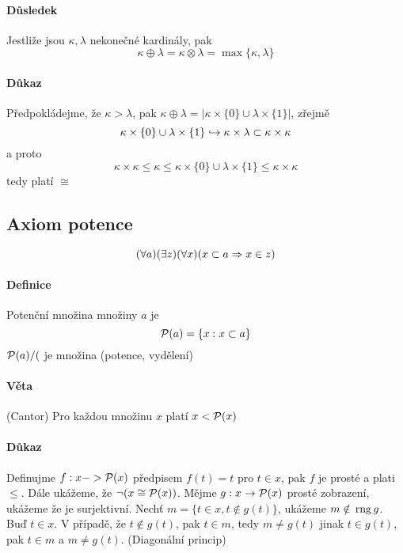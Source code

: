 \documentclass[a4paper,12pt,titlepage]{article}
\begin{document}
\paragraph{Důsledek} 
Jestliže jsou $\kappa, \lambda$ nekonečné kardinály, pak 
$$
	\kappa \oplus \lambda = \kappa \otimes \lambda =  \max\{\kappa, \lambda\}
$$

\paragraph{Důkaz}
Předpokládejme, že $\kappa > \lambda$, pak $\kappa \oplus \lambda = |\kappa \times \{0\} 
\cup \lambda \times \{1\}|$, zřejmě 
$$
\kappa \times \{0\} \cup \lambda \times \{1\} 
	\hookrightarrow \kappa \times \lambda \subset \kappa \times \kappa \\
$$
a proto
$$
	\kappa \times \kappa \le \kappa \le \kappa \times \{0\} \cup \lambda \times \{1\}
		\le \kappa \times \kappa
$$
tedy platí $\cong$


\subsection{Axiom potence}
$$
	(\forall a)(\exists z)(\forall x)(x \subset a \Rightarrow x \in z)
$$

\paragraph{Definice}
Potenční množina množiny $a$ je 
$$
	\mathcal{P}(a) = \{ x: x \subset a \}
$$
$\mathcal{P}(a)/($ je množina (potence, vydělení)

\paragraph{Věta}
(Cantor) Pro každou množinu $x$ platí $x < \mathcal{P}(x)$

\paragraph{Důkaz}
Definujme $f: x -> \mathcal{P}(x)$ předpisem $f(t) = {t}$ pro $t \in x$, pak $f$ je prosté
a plati $\le$. Dále ukážeme, že $ \neg (x \cong \mathcal{P}(x))$. Mějme $g: x \to \mathcal{P}(x)$ 
prosté zobrazení, ukážeme že je surjektivní. Nechť $m = \{ t \in x, t \nin g(t) \}$, ukážeme
$m \notin \operatorname*{\,rng}{g}$. Buď $t \in x$. V případě, že $t \nin g(t)$, pak $t \in m $, tedy $m \ne g(t)$
jinak $t \in g(t)$, pak $t \in m$ a $m \ne g(t)$. (Diagonální princip)
\end{document}
